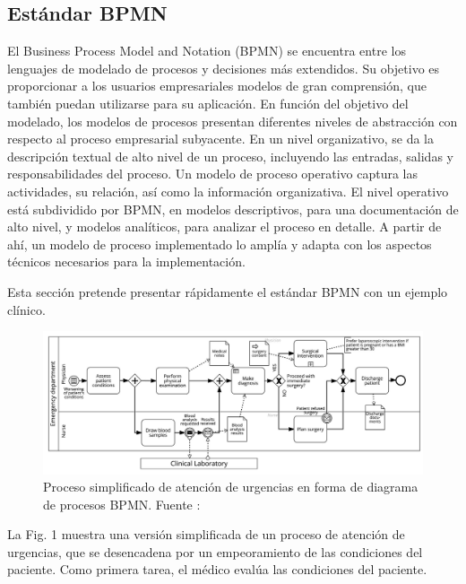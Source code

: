 \subsection{Estándar BPMN}

El Business Process Model and Notation (BPMN) se encuentra entre los lenguajes de modelado de procesos y decisiones más extendidos. Su objetivo es proporcionar a los usuarios empresariales modelos de gran comprensión, que también puedan utilizarse para su aplicación. En función del objetivo del modelado, los modelos de procesos presentan diferentes niveles de abstracción con respecto al proceso empresarial subyacente. En un nivel organizativo, se da la descripción textual de alto nivel de un proceso, incluyendo las entradas, salidas y responsabilidades del proceso. Un modelo de proceso operativo captura las actividades, su relación, así como la información organizativa. El nivel operativo está subdividido por BPMN, en modelos descriptivos, para una documentación de alto nivel, y modelos analíticos, para analizar el proceso en detalle. A partir de ahí, un modelo de proceso implementado lo amplía y adapta con los aspectos técnicos necesarios para la implementación.

Esta sección pretende presentar rápidamente el estándar BPMN con un ejemplo clínico.

\begin{figure}[H]
    \centering
    \includegraphics[width=\textwidth]{img/bpmn.png}
    \caption{Proceso simplificado de atención de urgencias en forma de diagrama de procesos BPMN. Fuente : }
    \label{fig:bpmn}
\end{figure}

La Fig. 1 muestra una versión simplificada de un proceso de atención de urgencias, que se desencadena por un empeoramiento de las condiciones del paciente. Como primera tarea, el médico evalúa las condiciones del paciente.

